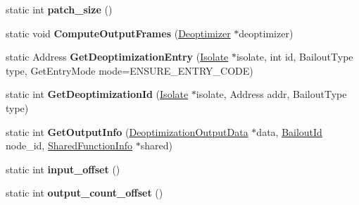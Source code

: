 \begin{DoxyCompactItemize}
\item 
\hypertarget{classv8_1_1internal_1_1_deoptimizer_a5bc349a59230deadd81b5e2c223fad38}{}static int {\bfseries patch\+\_\+size} ()\label{classv8_1_1internal_1_1_deoptimizer_a5bc349a59230deadd81b5e2c223fad38}

\item 
\hypertarget{classv8_1_1internal_1_1_deoptimizer_a27cf077b48bd6ef6ff9905b2ebccc6c1}{}static void {\bfseries Compute\+Output\+Frames} (\hyperlink{classv8_1_1internal_1_1_deoptimizer}{Deoptimizer} $\ast$deoptimizer)\label{classv8_1_1internal_1_1_deoptimizer_a27cf077b48bd6ef6ff9905b2ebccc6c1}

\item 
\hypertarget{classv8_1_1internal_1_1_deoptimizer_a580a91a489454504e540524af2f6fe8b}{}static Address {\bfseries Get\+Deoptimization\+Entry} (\hyperlink{classv8_1_1internal_1_1_isolate}{Isolate} $\ast$isolate, int id, Bailout\+Type type, Get\+Entry\+Mode mode=E\+N\+S\+U\+R\+E\+\_\+\+E\+N\+T\+R\+Y\+\_\+\+C\+O\+D\+E)\label{classv8_1_1internal_1_1_deoptimizer_a580a91a489454504e540524af2f6fe8b}

\item 
\hypertarget{classv8_1_1internal_1_1_deoptimizer_aecabaf25305bc863b7ab363b184fde4d}{}static int {\bfseries Get\+Deoptimization\+Id} (\hyperlink{classv8_1_1internal_1_1_isolate}{Isolate} $\ast$isolate, Address addr, Bailout\+Type type)\label{classv8_1_1internal_1_1_deoptimizer_aecabaf25305bc863b7ab363b184fde4d}

\item 
\hypertarget{classv8_1_1internal_1_1_deoptimizer_aa373a2817b667cc5ed376ada3f9ce3a8}{}static int {\bfseries Get\+Output\+Info} (\hyperlink{classv8_1_1internal_1_1_deoptimization_output_data}{Deoptimization\+Output\+Data} $\ast$data, \hyperlink{classv8_1_1internal_1_1_bailout_id}{Bailout\+Id} node\+\_\+id, \hyperlink{classv8_1_1internal_1_1_shared_function_info}{Shared\+Function\+Info} $\ast$shared)\label{classv8_1_1internal_1_1_deoptimizer_aa373a2817b667cc5ed376ada3f9ce3a8}

\item 
\hypertarget{classv8_1_1internal_1_1_deoptimizer_a596fc3bd6f8ae86360b9aecb5a240ce6}{}static int {\bfseries input\+\_\+offset} ()\label{classv8_1_1internal_1_1_deoptimizer_a596fc3bd6f8ae86360b9aecb5a240ce6}

\item 
\hypertarget{classv8_1_1internal_1_1_deoptimizer_a76a3faf66ccb1821e439a49f206b51bf}{}static int {\bfseries output\+\_\+count\+\_\+offset} ()\label{classv8_1_1internal_1_1_deoptimizer_a76a3faf66ccb1821e439a49f206b51bf}


\end{DoxyCompactItemize}
